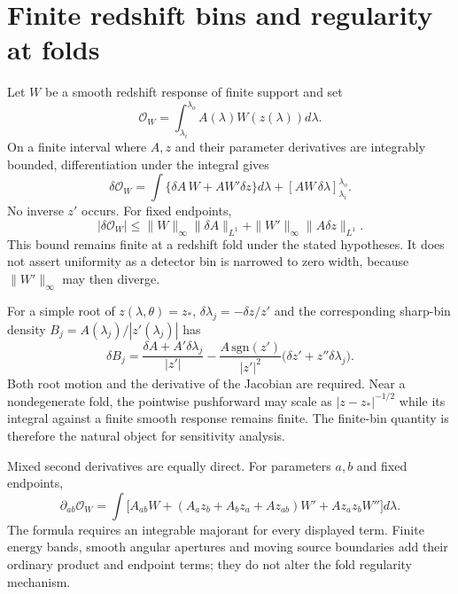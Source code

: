 \section{Finite redshift bins and regularity at folds}
Let $W$ be a smooth redshift response of finite support and set
\begin{equation}\label{vii:finite_bin}
\mathcal O_W=\int_{\lambda_i}^{\lambda_o}A(\lambda)W(z(\lambda))d\lambda.
\end{equation}
On a finite interval where $A,z$ and their parameter derivatives are integrably bounded, differentiation under the integral gives
\begin{equation}\label{vii:finite_bin_tangent}
\delta\mathcal O_W=\int\{\delta A\,W+A W'\delta z\}d\lambda
+[AW\,\delta\lambda]_{\lambda_i}^{\lambda_o}.
\end{equation}
No inverse $z'$ occurs. For fixed endpoints,
\begin{equation}\label{vii:finite_bin_bound}
|\delta\mathcal O_W|\le\|W\|_\infty\|\delta A\|_{L^1}
+\|W'\|_\infty\|A\delta z\|_{L^1}.
\end{equation}
This bound remains finite at a redshift fold under the stated hypotheses. It does not assert uniformity as a detector bin is narrowed to zero width, because $\|W'\|_\infty$ may then diverge.

For a simple root of $z(\lambda,\theta)=z_*$, $\delta\lambda_j=-\delta z/z'$ and the corresponding sharp-bin density $B_j=A(\lambda_j)/|z'(\lambda_j)|$ has
\begin{equation}\label{vii:sharp_bin_tangent}
\delta B_j=\frac{\delta A+A'\delta\lambda_j}{|z'|}
-\frac{A\,\mathrm{sgn}(z')}{|z'|^2}
\big(\delta z'+z''\delta\lambda_j\big).
\end{equation}
Both root motion and the derivative of the Jacobian are required. Near a nondegenerate fold, the pointwise pushforward may scale as $|z-z_*|^{-1/2}$ while its integral against a finite smooth response remains finite. The finite-bin quantity is therefore the natural object for sensitivity analysis.

Mixed second derivatives are equally direct. For parameters $a,b$ and fixed endpoints,
\begin{equation}\label{vii:second_bin_tangent}
\partial_{ab}\mathcal O_W=\int\big[
A_{ab}W+(A_a z_b+A_b z_a+A z_{ab})W'
+A z_a z_b W''\big]d\lambda.
\end{equation}
The formula requires an integrable majorant for every displayed term. Finite energy bands, smooth angular apertures and moving source boundaries add their ordinary product and endpoint terms; they do not alter the fold regularity mechanism.

